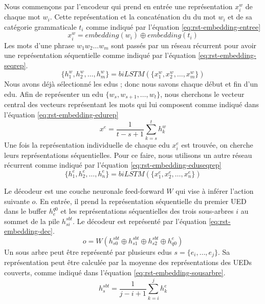 \documentclass{KodeBook}
\begin{document}
Nous commençons par l'encodeur qui prend en entrée une représentation $x_i^w$ de chaque mot $w_i$. 
Cette représentation et la concaténation du  du mot $w_i$ et de sa catégorie grammaticale $t_i$ comme indiqué par l'équation \ref{eq:rst-embedding-entree}
\begin{equation}\label{eq:rst-embedding-entree}
x_i^w = embedding(w_i) \oplus embedding(t_i)
\end{equation}
Les mots d'une phrase $w_1 w_2 \ldots w_m$ sont passés par un réseau récurrent  pour avoir une représentation séquentielle comme indiqué par l'équation \ref{eq:rst-embedding-seqrep}.
\begin{equation}\label{eq:rst-embedding-seqrep}
\{h_1^w, h_2^w, \ldots, h_m^w \} = biLSTM(\{x_1^w, x_2^w, \ldots, x_m^w \})
\end{equation}
Nous avons déjà sélectionné les \ac{edu}s ; donc nous savons chaque début et fin d'un \ac{edu}. 
Afin de représenter un \ac{edu} $\{w_s, w_{s+1}, \ldots, w_t \}$, nous cherchons le vecteur central des vecteurs représentant les mots qui lui composent comme indiqué dans l'équation \ref{eq:rst-embedding-edurep}
\begin{equation}\label{eq:rst-embedding-edurep}
x^e = \frac{1}{t-s+1} \sum_{k=s}^{t} h_k^w
\end{equation}
Une fois la représentation individuelle de chaque \ac{edu} $x_i^e$ est trouvée, on cherche leurs représentations séquentielles. 
Pour ce faire, nous utilisons un autre réseau récurrent  comme indiqué par l'équation \ref{eq:rst-embedding-eduseqrep}
\begin{equation}\label{eq:rst-embedding-eduseqrep}
\{h_1^e, h_2^e, \ldots, h_n^e \} = biLSTM(\{x_1^e, x_2^e, \ldots, x_n^e \})
\end{equation}

Le décodeur est une couche neuronale feed-forward $W$ qui vise à inférer l'action suivante $o$. 
En entrée, il prend la représentation séquentielle du premier UED dans le buffer $ h_{e}^{q0} $ et les représentations séquentielles des trois sous-arbres $i$ au sommet de la pile $h_{si}^{sbt}$. 
Le décodeur est représenté par l'équation \ref{eq:rst-embedding-dec}. 
\begin{equation}\label{eq:rst-embedding-dec}
o = W(h_{s0}^{sbt} \oplus h_{s1}^{sbt} \oplus h_{s2}^{sbt} \oplus h_{q0}^{e})
\end{equation}
Un sous arbre peut être représenté par plusieurs \ac{edu}s $ s= \{e_i, \ldots, e_j\}$. 
Sa représentation peut être calculée par la moyenne des représentations des UEDs couverts, comme indiqué dans l'équation \ref{eq:rst-embedding-sousarbre}. 
\begin{equation}\label{eq:rst-embedding-sousarbre}
h_{s}^{sbt} = \frac{1}{j-i+1} \sum_{k=i}^{j} h_k^e
\end{equation}
\end{document}
